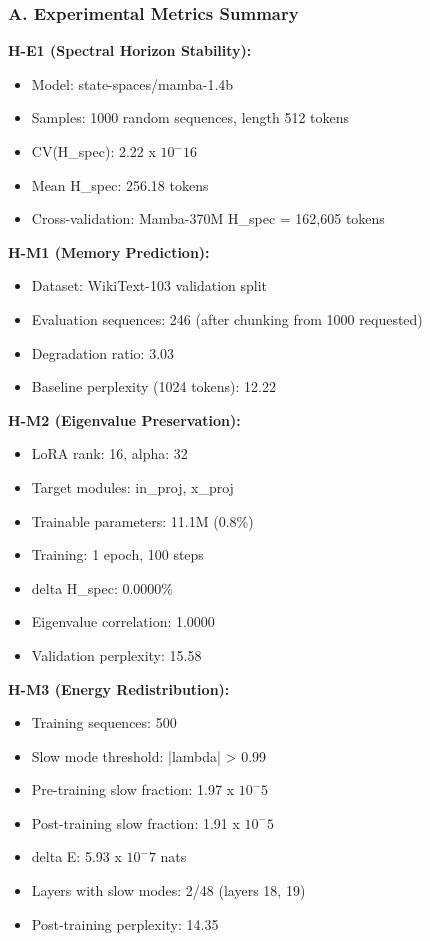 
\subsubsection{A. Experimental Metrics Summary}

\textbf{H-E1 (Spectral Horizon Stability):}
\begin{itemize}
\item Model: state-spaces/mamba-1.4b
\item Samples: 1000 random sequences, length 512 tokens
\item CV(H\_spec): 2.22 x $10^-16$
\item Mean H\_spec: 256.18 tokens
\item Cross-validation: Mamba-370M H\_spec = 162,605 tokens
\end{itemize}

\textbf{H-M1 (Memory Prediction):}
\begin{itemize}
\item Dataset: WikiText-103 validation split
\item Evaluation sequences: 246 (after chunking from 1000 requested)
\item Degradation ratio: 3.03
\item Baseline perplexity (1024 tokens): 12.22
\end{itemize}

\textbf{H-M2 (Eigenvalue Preservation):}
\begin{itemize}
\item LoRA rank: 16, alpha: 32
\item Target modules: in\_proj, x\_proj
\item Trainable parameters: 11.1M (0.8\%)
\item Training: 1 epoch, 100 steps
\item delta H\_spec: 0.0000\%
\item Eigenvalue correlation: 1.0000
\item Validation perplexity: 15.58
\end{itemize}

\textbf{H-M3 (Energy Redistribution):}
\begin{itemize}
\item Training sequences: 500
\item Slow mode threshold: |lambda| > 0.99
\item Pre-training slow fraction: 1.97 x $10^-5$
\item Post-training slow fraction: 1.91 x $10^-5$
\item delta E: 5.93 x $10^-7$ nats
\item Layers with slow modes: 2/48 (layers 18, 19)
\item Post-training perplexity: 14.35
\end{itemize}

